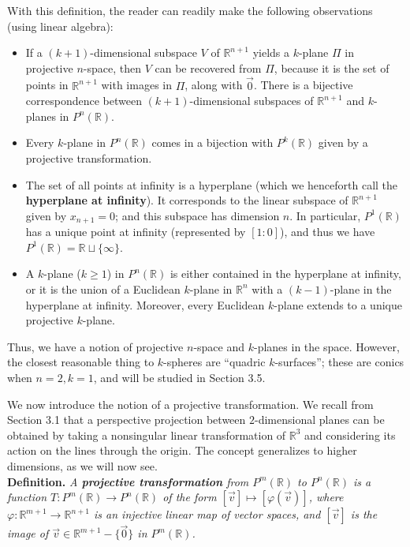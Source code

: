 \documentclass[leqno]{book}
\begin{document}
\noindent With this definition, the reader can readily make the following observations (using linear algebra):
\begin{itemize}
\item If a $(k+1)$-dimensional subspace $V$ of $\mathbb R^{n+1}$ yields a $k$-plane $\Pi$ in projective $n$-space, then $V$ can be recovered from $\Pi$, because it is the set of points in $\mathbb R^{n+1}$ with images in $\Pi$, along with $\vec 0$.  There is a bijective correspondence between $(k+1)$-dimensional subspaces of $\mathbb R^{n+1}$ and $k$-planes in $P^n(\mathbb R)$.

\item Every $k$-plane in $P^n(\mathbb R)$ comes in a bijection with $P^k(\mathbb R)$ given by a projective transformation.

\item The set of all points at infinity is a hyperplane (which we henceforth call the \textbf{hyperplane at infinity}).  It corresponds to the linear subspace of $\mathbb R^{n+1}$ given by $x_{n+1}=0$; and this subspace has dimension $n$.  In particular, $P^1(\mathbb R)$ has a unique point at infinity (represented by $[1:0]$), and thus we have $P^1(\mathbb R)=\mathbb R\sqcup\{\infty\}$.

\item A $k$-plane ($k\geqslant 1$) in $P^n(\mathbb R)$ is either contained in the hyperplane at infinity, or it is the union of a Euclidean $k$-plane in $\mathbb R^n$ with a $(k-1)$-plane in the hyperplane at infinity.  Moreover, every Euclidean $k$-plane extends to a unique projective $k$-plane.
\end{itemize}
\noindent Thus, we have a notion of projective $n$-space and $k$-planes in the space.  However, the closest reasonable thing to $k$-spheres are ``quadric $k$-surfaces''; these are conics when $n=2,k=1$, and will be studied in Section 3.5.

We now introduce the notion of a projective transformation.  We recall from Section 3.1 that a perspective projection between $2$-dimensional planes can be obtained by taking a nonsingular linear transformation of $\mathbb R^3$ and considering its action on the lines through the origin.  The concept generalizes to higher dimensions, as we will now see.\\

\noindent\textbf{Definition.} \emph{A \textbf{projective transformation} from $P^m(\mathbb R)$ to $P^n(\mathbb R)$ is a function $T:P^m(\mathbb R)\to P^n(\mathbb R)$ of the form $[\vec v]\mapsto[\varphi(\vec v)]$, where $\varphi:\mathbb R^{m+1}\to\mathbb R^{n+1}$ is an injective linear map of vector spaces, and $[\vec v]$ is the image of $\vec v\in\mathbb R^{m+1}-\{\vec 0\}$ in $P^m(\mathbb R)$.}\\
\end{document}
